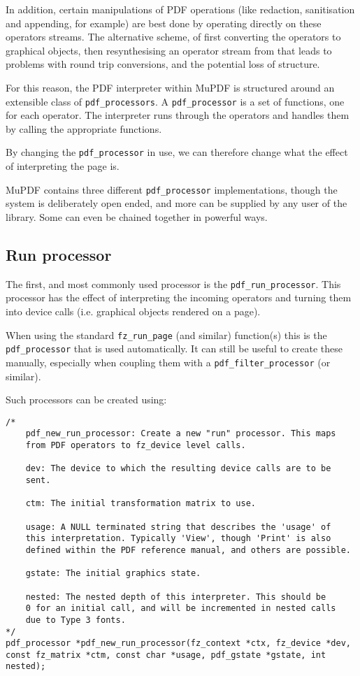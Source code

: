 \documentclass[oneside]{book}
\begin{document}
In addition, certain manipulations of PDF operations (like redaction, sanitisation and appending, for example) are best done by operating directly on these operators streams. The alternative scheme, of first converting the operators to graphical objects, then resynthesising an operator stream from that leads to problems with round trip conversions, and the potential loss of structure.

For this reason, the PDF interpreter within MuPDF is structured around an extensible class of \texttt{pdf\_processors}. A \texttt{pdf\_processor} is a set of functions, one for each operator. The interpreter runs through the operators and handles them by calling the appropriate functions.

By changing the \texttt{pdf\_processor} in use, we can therefore change what the effect of interpreting the page is.

MuPDF contains three different \texttt{pdf\_processor} implementations, though the system is deliberately open ended, and more can be supplied by any user of the library. Some can even be chained together in powerful ways.

\subsection{Run processor}

The first, and most commonly used processor is the \texttt{pdf\_run\_processor}. This processor has the effect of interpreting the incoming operators and turning them into device calls (i.e. graphical objects rendered on a page).

When using the standard \texttt{fz\_run\_page} (and similar) function(s) this is the \texttt{pdf\_processor} that is used automatically. It can still be useful to create these manually, especially when coupling them with a \texttt{pdf\_filter\_processor}
(or similar).

Such processors can be created using:

\begin{lstlisting}
/*
	pdf_new_run_processor: Create a new "run" processor. This maps
	from PDF operators to fz_device level calls.

	dev: The device to which the resulting device calls are to be
	sent.

	ctm: The initial transformation matrix to use.

	usage: A NULL terminated string that describes the 'usage' of
	this interpretation. Typically 'View', though 'Print' is also
	defined within the PDF reference manual, and others are possible.

	gstate: The initial graphics state.

	nested: The nested depth of this interpreter. This should be
	0 for an initial call, and will be incremented in nested calls
	due to Type 3 fonts.
*/
pdf_processor *pdf_new_run_processor(fz_context *ctx, fz_device *dev, const fz_matrix *ctm, const char *usage, pdf_gstate *gstate, int nested);
\end{lstlisting}
\end{document}

